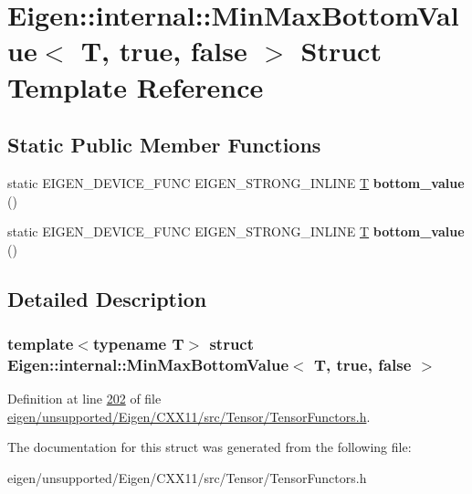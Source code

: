 \hypertarget{struct_eigen_1_1internal_1_1_min_max_bottom_value_3_01_t_00_01true_00_01false_01_4}{}\section{Eigen\+:\+:internal\+:\+:Min\+Max\+Bottom\+Value$<$ T, true, false $>$ Struct Template Reference}
\label{struct_eigen_1_1internal_1_1_min_max_bottom_value_3_01_t_00_01true_00_01false_01_4}
\subsection*{Static Public Member Functions}
\begin{DoxyCompactItemize}
\item 
\mbox{\label{struct_eigen_1_1internal_1_1_min_max_bottom_value_3_01_t_00_01true_00_01false_01_4_ac1145c6858176be30b3a9f9edb9ec67b}} 
static E\+I\+G\+E\+N\+\_\+\+D\+E\+V\+I\+C\+E\+\_\+\+F\+U\+NC E\+I\+G\+E\+N\+\_\+\+S\+T\+R\+O\+N\+G\+\_\+\+I\+N\+L\+I\+NE \hyperlink{group___sparse_core___module}{T} {\bfseries bottom\+\_\+value} ()
\item 
\mbox{\label{struct_eigen_1_1internal_1_1_min_max_bottom_value_3_01_t_00_01true_00_01false_01_4_ac1145c6858176be30b3a9f9edb9ec67b}} 
static E\+I\+G\+E\+N\+\_\+\+D\+E\+V\+I\+C\+E\+\_\+\+F\+U\+NC E\+I\+G\+E\+N\+\_\+\+S\+T\+R\+O\+N\+G\+\_\+\+I\+N\+L\+I\+NE \hyperlink{group___sparse_core___module}{T} {\bfseries bottom\+\_\+value} ()
\end{DoxyCompactItemize}


\subsection{Detailed Description}
\subsubsection*{template$<$typename T$>$\newline
struct Eigen\+::internal\+::\+Min\+Max\+Bottom\+Value$<$ T, true, false $>$}



Definition at line \hyperlink{eigen_2unsupported_2_eigen_2_c_x_x11_2src_2_tensor_2_tensor_functors_8h_source_l00202}{202} of file \hyperlink{eigen_2unsupported_2_eigen_2_c_x_x11_2src_2_tensor_2_tensor_functors_8h_source}{eigen/unsupported/\+Eigen/\+C\+X\+X11/src/\+Tensor/\+Tensor\+Functors.\+h}.



The documentation for this struct was generated from the following file\+:\begin{DoxyCompactItemize}
\item 
eigen/unsupported/\+Eigen/\+C\+X\+X11/src/\+Tensor/\+Tensor\+Functors.\+h\end{DoxyCompactItemize}
